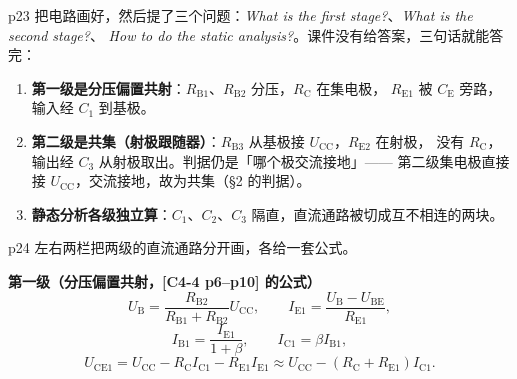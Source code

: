 \documentclass[11pt]{ctexart}
\begin{document}




p23 把电路画好，然后提了三个问题：\textit{What is the first stage?}、\textit{What is the second stage?}、
\textit{How to do the static analysis?}。课件没有给答案，三句话就能答完：
\begin{enumerate}
\item \textbf{第一级是分压偏置共射}：$R_{\mathrm{B1}}$、$R_{\mathrm{B2}}$ 分压，$R_{\mathrm{C}}$ 在集电极，
$R_{\mathrm{E1}}$ 被 $C_{\mathrm{E}}$ 旁路，输入经 $C_1$ 到基极。
\item \textbf{第二级是共集（射极跟随器）}：$R_{\mathrm{B3}}$ 从基极接 $U_{\mathrm{CC}}$，$R_{\mathrm{E2}}$ 在射极，
没有 $R_{\mathrm{C}}$，输出经 $C_3$ 从射极取出。判据仍是「哪个极交流接地」——
第二级集电极直接接 $U_{\mathrm{CC}}$，交流接地，故为共集（§2 的判据）。
\item \textbf{静态分析各级独立算}：$C_1$、$C_2$、$C_3$ 隔直，直流通路被切成互不相连的两块。
\end{enumerate}



p24 左右两栏把两级的直流通路分开画，各给一套公式。

\textbf{第一级（分压偏置共射，[C4-4 p6--p10] 的公式）}
\[
U_{\mathrm{B}}=\frac{R_{\mathrm{B2}}}{R_{\mathrm{B1}}+R_{\mathrm{B2}}}U_{\mathrm{CC}},\qquad
I_{\mathrm{E1}}=\frac{U_{\mathrm{B}}-U_{\mathrm{BE}}}{R_{\mathrm{E1}}},
\]
\[
I_{\mathrm{B1}}=\frac{I_{\mathrm{E1}}}{1+\beta},\qquad I_{\mathrm{C1}}=\beta I_{\mathrm{B1}},
\]
\[
U_{\mathrm{CE1}}=U_{\mathrm{CC}}-R_{\mathrm{C}}I_{\mathrm{C1}}-R_{\mathrm{E1}}I_{\mathrm{E1}}
\approx U_{\mathrm{CC}}-(R_{\mathrm{C}}+R_{\mathrm{E1}})I_{\mathrm{C1}} .
\]
\end{document}
